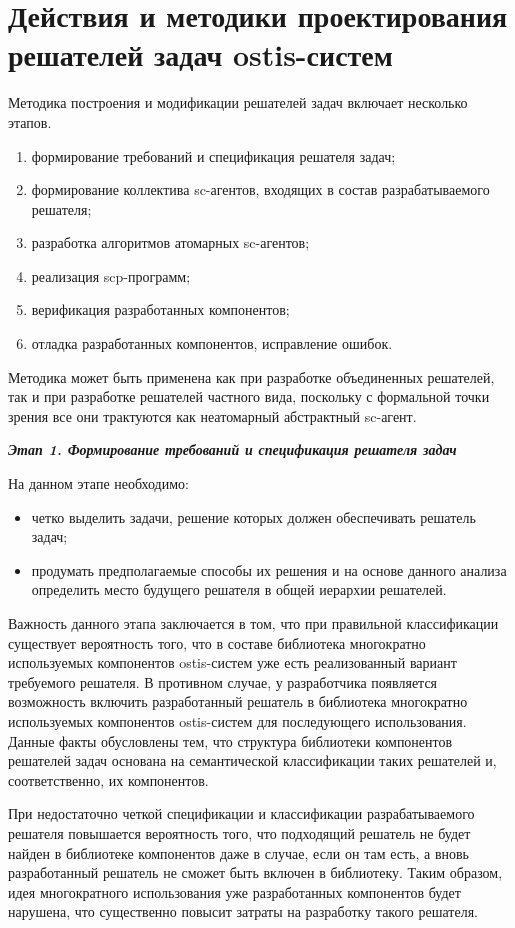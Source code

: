 \section{Действия и методики проектирования решателей задач ostis-систем}

Методика построения и модификации решателей задач включает несколько этапов. 
\begin{enumerate}
    \item формирование требований и спецификация  решателя задач;
    \item формирование коллектива sc-агентов, входящих в состав разрабатываемого решателя;
    \item разработка алгоритмов атомарных sc-агентов;
    \item реализация scp-программ;
    \item верификация разработанных компонентов;
    \item отладка разработанных компонентов, исправление ошибок.
\end{enumerate}

Методика может быть применена как при разработке объединенных решателей, так и при разработке решателей частного вида, поскольку с формальной точки зрения все они трактуются как неатомарный абстрактный sc-агент.

\textbf{\textit{Этап 1. Формирование требований и спецификация  решателя задач}}

На данном этапе необходимо:
\begin{itemize}
\item четко выделить задачи, решение которых должен обеспечивать решатель задач;
\item продумать предполагаемые способы их решения и на основе данного анализа определить место будущего решателя в общей иерархии решателей.
\end{itemize}

Важность данного этапа заключается в том, что при правильной классификации существует вероятность того, что в составе библиотека многократно используемых компонентов ostis-систем уже есть реализованный вариант требуемого решателя. В противном случае, у разработчика появляется возможность включить разработанный решатель в библиотека многократно используемых компонентов ostis-систем для последующего использования. Данные факты обусловлены тем, что структура библиотеки компонентов решателей задач основана на семантической классификации таких решателей и, соответственно, их компонентов.

При недостаточно четкой спецификации и классификации разрабатываемого решателя повышается вероятность того, что подходящий решатель не будет найден в библиотеке компонентов даже в случае, если он там есть, а вновь разработанный решатель не сможет быть включен в библиотеку. Таким образом, идея многократного использования уже разработанных компонентов будет нарушена, что существенно повысит затраты на разработку такого решателя.


